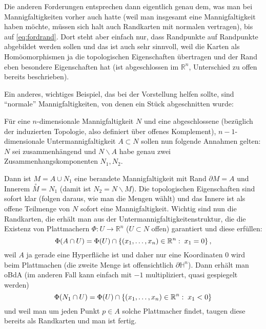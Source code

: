 \documentclass[../H_Analysis_main.tex]{subfiles}
\begin{document}

Die anderen Forderungen entsprechen dann eigentlich genau dem, was man bei Mannigfaltigkeiten vorher auch hatte (weil man insgesamt eine Mannigfaltigkeit haben möchte, müssen sich halt auch Randkarten mit normalen vertragen), bis auf \eqref{eq:fordrand}. Dort steht aber einfach nur, dass Randpunkte auf Randpunkte abgebildet werden sollen und das ist auch sehr sinnvoll, weil die Karten als Homöomorphismen ja die topologischen Eigenschaften übertragen und der Rand eben besondere Eigenschaften hat (ist abgeschlossen im $\mathbb{R}^n$, Unterschied zu offen bereits beschrieben).



Ein anderes, wichtiges Beispiel, das bei der Vorstellung helfen sollte, sind \enquote{normale} Mannigfaltigkeiten, von denen ein Stück abgeschnitten wurde:
\begin{bsp}\label{bsp:mfmitrandbsp}
Für eine $n$-dimensionale Mannigfaltigkeit $N$ und eine abgeschlossene (bezüglich der induzierten Topologie, also definiert über offenes Komplement), $n - 1$-dimensionale Untermannigfaltigkeit $A \subset N$ sollen nun folgende Annahmen gelten: $N$ sei zusammenhängend und $N \backslash A$ habe genau zwei Zusammenhangskomponenten $N_1, N_2$.

Dann ist $M = A \cup N_1$ eine berandete Mannigfaltigkeit mit Rand $\partial M = A$ und Innerem $\overset{\circ}{M} = N_1$ (damit ist $N_2 = N \backslash M $). Die topologischen Eigenschaften sind sofort klar (folgen daraus, wie man die Mengen wählt) und das Innere ist als offene Teilmenge von $N$ sofort eine Mannigfaltigkeit. Wichtig sind nun die Randkarten, die erhält man aus der Untermannigfaltigkeitenstruktur, die die Existenz von Plattmachern $\Phi: U \rightarrow \mathbb{R}^n$ ($U \subset N$ offen) garantiert und diese erfüllen:
\begin{equation}
\Phi(A \cap U) = \Phi(U) \cap  \qty{(x_1, \dots, x_n) \in \mathbb{R}^n: \; x_1 = 0} \, ,
\end{equation}
weil $A$ ja gerade eine Hyperfläche ist und daher nur eine Koordinaten 0 wird beim Plattmachen (die zweite Menge ist offensichtlich $\partial \mathbb{H}^n$). Dann erhält man oBdA (im anderen Fall kann einfach mit $-1$ multipliziert, quasi gespiegelt werden)
\begin{equation}
\Phi(N_1 \cap U) = \Phi(U) \cap \qty{(x_1, \dots, x_n) \in \mathbb{R}^n: \; x_1 < 0}
\end{equation}
und weil man um jeden Punkt $p \in A$ solche Plattmacher findet, taugen diese bereits als Randkarten und man ist fertig.
\end{bsp}
\end{document}
